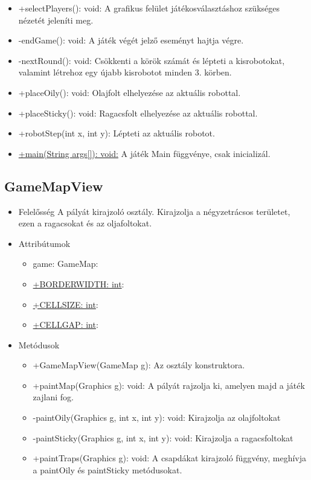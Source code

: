 \begin{itemize}
\begin{itemize}
		\item +selectPlayers(): void: A grafikus felület játékosválasztáshoz szükséges nézetét jeleníti meg.
		\item -endGame(): void: A játék végét jelző eseményt hajtja végre.
		\item -nextRound(): void: Csökkenti a körök számát és lépteti a kisrobotokat, valamint létrehoz egy újabb kisrobotot minden 3. körben.
		\item +placeOily(): void: Olajfolt elhelyezése az aktuális robottal. 
		\item +placeSticky(): void: Ragacsfolt elhelyezése az aktuális robottal.
		\item +robotStep(int x, int y): Lépteti az aktuális robotot.
		\item \underline{+main(String args[]): void:} A játék Main függvénye, csak inicializál.
	\end{itemize}
\end{itemize}

\subsection{GameMapView}
\begin{itemize}
	\item Felelősség\newline
	A pályát kirajzoló osztály. Kirajzolja a négyzetrácsos területet, ezen a ragacsokat és az oljafoltokat.

	\item Attribútumok
	\begin{itemize}
		\item game: GameMap: 
		\item \underline{+BORDERWIDTH: int}:
		\item \underline{+CELLSIZE: int}:
		\item \underline{+CELLGAP: int}:
	\end{itemize}
	\item Metódusok
	\begin{itemize}
		\item +GameMapView(GameMap g): Az osztály konstruktora.
		\item +paintMap(Graphics g): void: A pályát rajzolja ki, amelyen majd a játék zajlani fog.
		\item -paintOily(Graphics g, int x, int y): void: Kirajzolja az olajfoltokat
		\item -paintSticky(Graphics g, int x, int y): void: Kirajzolja a ragacsfoltokat
		\item +paintTraps(Graphics g): void: A csapdákat kirajzoló függvény, meghívja a paintOily és paintSticky metódusokat.
	\end{itemize}
\end{itemize}

